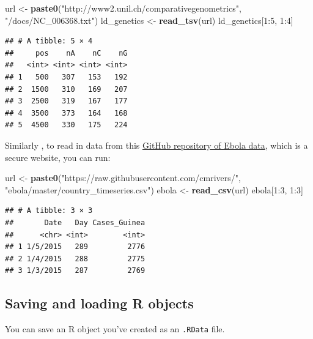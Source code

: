 \documentclass[]{book}
\makeatletter
\newenvironment{Shaded}{\begin{snugshade}}{\end{snugshade}}
\newcommand{\KeywordTok}[1]{\textcolor[rgb]{0.13,0.29,0.53}{\textbf{{#1}}}}
\newcommand{\DecValTok}[1]{\textcolor[rgb]{0.00,0.00,0.81}{{#1}}}
\newcommand{\StringTok}[1]{\textcolor[rgb]{0.31,0.60,0.02}{{#1}}}
\newcommand{\NormalTok}[1]{{#1}}
\newenvironment{kframe}{%
\medskip{}
\setlength{\fboxsep}{.8em}
 \def\at@end@of@kframe{}%
 \ifinner\ifhmode%
  \def\at@end@of@kframe{\end{minipage}}%
  \begin{minipage}{\columnwidth}%
 \fi\fi%
 \def\FrameCommand##1{\hskip\@totalleftmargin \hskip-\fboxsep
 \colorbox{shadecolor}{##1}\hskip-\fboxsep
     \hskip-\linewidth \hskip-\@totalleftmargin \hskip\columnwidth}%
 \MakeFramed {\advance\hsize-\width
   \@totalleftmargin\z@ \linewidth\hsize
   \@setminipage}}%
 {\par\unskip\endMakeFramed%
 \at@end@of@kframe}
\renewenvironment{Shaded}{\begin{kframe}}{\end{kframe}}
\makeatother
\begin{document}
\begin{Shaded}
\begin{Highlighting}[]
\NormalTok{url <-}\StringTok{ }\KeywordTok{paste0}\NormalTok{(}\StringTok{"http://www2.unil.ch/comparativegenometrics"}\NormalTok{,}
              \StringTok{"/docs/NC_006368.txt"}\NormalTok{)}
\NormalTok{ld_genetics <-}\StringTok{ }\KeywordTok{read_tsv}\NormalTok{(url)}
\NormalTok{ld_genetics[}\DecValTok{1}\NormalTok{:}\DecValTok{5}\NormalTok{, }\DecValTok{1}\NormalTok{:}\DecValTok{4}\NormalTok{]}
\end{Highlighting}
\end{Shaded}

\begin{verbatim}
## # A tibble: 5 × 4
##     pos    nA    nC    nG
##   <int> <int> <int> <int>
## 1   500   307   153   192
## 2  1500   310   169   207
## 3  2500   319   167   177
## 4  3500   373   164   168
## 5  4500   330   175   224
\end{verbatim}

Similarly , to read in data from this
\href{https://raw.githubusercontent.com/cmrivers/ebola/master/country_timeseries.csv}{GitHub
repository of Ebola data}, which is a secure website, you can run:

\begin{Shaded}
\begin{Highlighting}[]
\NormalTok{url <-}\StringTok{ }\KeywordTok{paste0}\NormalTok{(}\StringTok{"https://raw.githubusercontent.com/cmrivers/"}\NormalTok{,}
              \StringTok{"ebola/master/country_timeseries.csv"}\NormalTok{)}
\NormalTok{ebola <-}\StringTok{ }\KeywordTok{read_csv}\NormalTok{(url)}
\NormalTok{ebola[}\DecValTok{1}\NormalTok{:}\DecValTok{3}\NormalTok{, }\DecValTok{1}\NormalTok{:}\DecValTok{3}\NormalTok{]}
\end{Highlighting}
\end{Shaded}

\begin{verbatim}
## # A tibble: 3 × 3
##       Date   Day Cases_Guinea
##      <chr> <int>        <int>
## 1 1/5/2015   289         2776
## 2 1/4/2015   288         2775
## 3 1/3/2015   287         2769
\end{verbatim}

\subsection{Saving and loading R
objects}\label{saving-and-loading-r-objects}

You can save an R object you've created as an \texttt{.RData} file.
\end{document}
